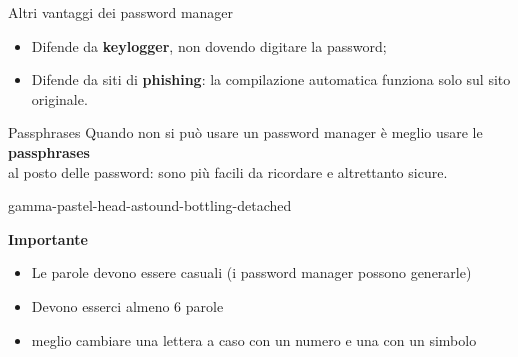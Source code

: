 \begin{myframe}{Altri vantaggi dei password manager}
  \begin{itemize}
    \item Difende da \textbf{keylogger}, non dovendo digitare la password;
    \item Difende da siti di \textbf{phishing}: la compilazione automatica funziona solo sul sito originale.
  \end{itemize}
\end{myframe}

\begin{myframe}{Passphrases}
  Quando non si può usare un password manager è meglio usare  le \textbf{passphrases}\\al posto delle password: sono più facili da ricordare e altrettanto sicure.

  \pause\bigskip
  gamma-pastel-head-astound-bottling-detached

  \pause\bigskip
  {\raggedright\textbf{Importante}\\}
  \begin{itemize}
    \item Le parole devono essere casuali (i password manager possono generarle)
    \item Devono esserci almeno 6 parole
    \item meglio cambiare una lettera a caso con un numero e una con un simbolo
  \end{itemize}
\end{myframe}


